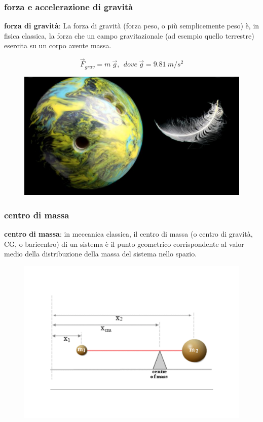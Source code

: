 \documentclass{beamer}
\begin{document}
\begin{frame}
\frametitle{forza e accelerazione di gravità}
\textbf{forza di gravità}: La forza di gravità (forza peso, o più semplicemente peso) è, in fisica classica, la forza che un campo gravitazionale (ad esempio quello terrestre) esercita su un corpo avente massa.
\pause

$$\vec{F}_{grav} = m \  \vec{g}, \ \ dove \  \vec{g} = 9.81 \ m/s^2$$ 
\pause

\begin{figure}
\includegraphics[scale=0.25]{./images/feather}
\end{figure}

\end{frame}

\begin{frame}
\frametitle{centro di massa}
\textbf{centro di massa}: in meccanica classica, il centro di massa (o centro di gravità, CG, o baricentro) di un sistema è il punto geometrico corrispondente al valor medio della distribuzione della massa del sistema nello spazio.
\pause

\begin{figure}
\includegraphics[scale=0.2]{./images/cdm}
\end{figure}


\end{frame}
\end{document}
